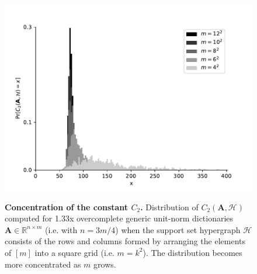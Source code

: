 \begin{figure}\label{reasonableC2}
\begin{center}
\includegraphics[width=1 \linewidth]{figures/C2.pdf}
\caption{\textbf{Concentration of the constant $C_2$.} Distribution of $C_2(\mathbf{A}, \mathcal{H})$ computed for 1.33x overcomplete generic unit-norm dictionaries $\mathbf{A} \in \mathbb{R}^{n \times m}$ (i.e. with $n = 3m/4$) when the support set hypergraph $\mathcal{H}$ consists of the rows and columns formed by arranging  the elements of $[m]$ into a square grid (i.e. $m = k^2$). The distribution becomes more concentrated as $m$ grows.}
\vspace{-.6 cm}
\label{samples_vs_m}
\end{center}
\end{figure}


